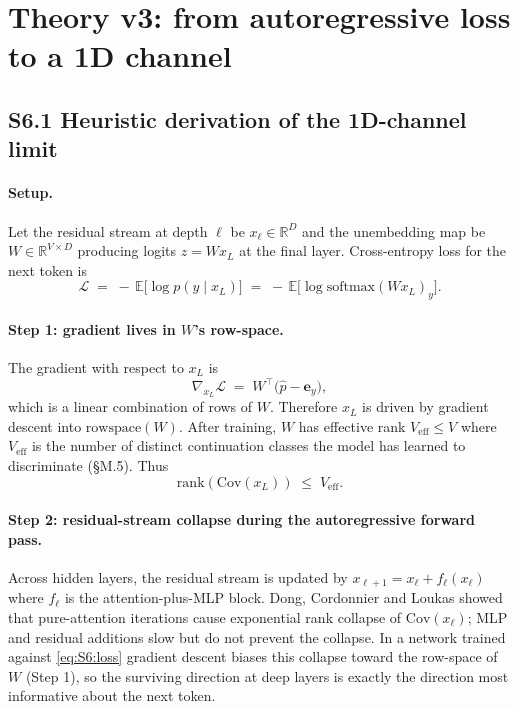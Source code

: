 \documentclass[11pt,a4paper]{article}
\begin{document}
\section{Theory v3: from autoregressive loss to a 1D channel}
\label{si:S6}

\subsection{S6.1 Heuristic derivation of the 1D-channel limit}

\paragraph{Setup.}
Let the residual stream at depth $\ell$ be $x_\ell \in \mathbb{R}^D$
and the unembedding map be $W \in \mathbb{R}^{V \times D}$ producing
logits $z = W x_L$ at the final layer.  Cross-entropy loss for the
next token is
\begin{equation}
\mathcal{L}\;=\;-\,\mathbb{E}\big[\log p(y \mid x_L)\big]
            \;=\; -\,\mathbb{E}\Big[\log \mathrm{softmax}(W x_L)_{y}\Big].
\label{eq:S6:loss}
\end{equation}

\paragraph{Step 1: gradient lives in $W$'s row-space.}
The gradient with respect to $x_L$ is
\begin{equation}
\nabla_{x_L} \mathcal{L} \;=\; W^\top\!\big(\hat{p} - \mathbf{e}_y\big),
\label{eq:S6:grad}
\end{equation}
which is a linear combination of rows of $W$.  Therefore $x_L$ is
driven by gradient descent into $\mathrm{rowspace}(W)$.  After
training, $W$ has effective rank $V_\mathrm{eff} \leq V$ where
$V_\mathrm{eff}$ is the number of distinct continuation classes the
model has learned to discriminate (\S M.5).  Thus
\begin{equation}
\mathrm{rank}(\mathrm{Cov}(x_L)) \;\leq\; V_\mathrm{eff}.
\label{eq:S6:rankbound}
\end{equation}

\paragraph{Step 2: residual-stream collapse during the autoregressive forward pass.}
Across hidden layers, the residual stream is updated by
$x_{\ell+1} = x_\ell + f_\ell(x_\ell)$ where $f_\ell$ is the
attention-plus-MLP block.  Dong, Cordonnier and Loukas \citep{dong2021}
showed that pure-attention iterations cause exponential rank collapse
of $\mathrm{Cov}(x_\ell)$; MLP and residual additions slow but do not
prevent the collapse.  In a network trained against \eqref{eq:S6:loss}
gradient descent biases this collapse toward the row-space of $W$
(Step 1), so the surviving direction at deep layers is exactly the
direction most informative about the next token.
\end{document}
